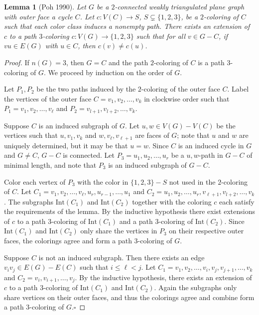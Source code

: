 \documentclass[12pt,letterpaper]{article}
\theoremstyle{plain}
\newtheorem{lemma}{Lemma}[section]           %
\theoremstyle{definition}
\theoremstyle{break}
\newcommand{\ggcqedsymbol}{$\square$}
\newcommand{\ggcqed}{\hbox{}\nobreak\hbox{\quad\ggcqedsymbol}}
\newcommand{\ggcnopf}{\ggcqed}
\begin{document}
\begin{lemma}[Poh 1990]\label{L:planar3c}
Let $G$ be a $2$-connected weakly triangulated plane graph with outer face a
cycle $C$. Let $c:V(C)\to S$, $S\subsetneq\{1,2,3\}$, be a $2$-coloring of $C$ such
that each color class induces a nonempty path. There exists an extension of
$c$ to a path $3$-coloring $c:V(G)\to\{1,2,3\}$ such that for all $v\in G-C$, if $vu\in
E(G)$ with $u\in C$, then $c(v)\ne c(u)$.
\end{lemma}

\begin{proof}
If $n(G)=3$, then $G=C$ and the path $2$-coloring of $C$ is a path
$3$-coloring of $G$. We proceed by induction on the order of $G$. 

Let $P_1,P_2$ be the two paths induced by the $2$-coloring of the outer face
$C$. 
Label the vertices of the outer face $C=v_1,v_2,\ldots, v_k$ in clockwise
order such that $P_1=v_1,v_2,\ldots, v_\ell$ and
$P_2=v_{l+1},v_{l+2},\ldots, v_k$.

Suppose $C$ is an induced subgraph of $G$. Let
$u,w\in V(G)-V(C)$ be the vertices such that $u,v_1,v_k$ and $w,v_\ell,v_{\ell+1}$
are faces of $G$; note that
$u$ and $w$ are uniquely determined, but it may be that $u=w$. Since
$C$ is an induced cycle in $G$ and $G\ne C$, $G-C$ is connected.
Let $P_3=u_1,u_2,\ldots,u_r$ be a $u,w$-path in $G-C$ of minimal length, and
note that $P_3$ is an induced subgraph of $G-C$.

Color each vertex of $P_3$ with the color in $\{1,2,3\}- S$ not used
in the $2$-coloring of
$C$. Let $C_1=v_1,v_2,\ldots,v_\ell,u_r,u_{r-1},\ldots,u_1$ and
$C_2=u_1,u_2,\ldots,u_r,v_{\ell+1},v_{l+2},\ldots,v_k$. The subgraphs
$\text{Int}(C_1)$ and $\text{Int}(C_2)$ together with the coloring $c$
each satisfy the requirements of the lemma. By the inductive hypothesis
there exist extensions of $c$ to a path
$3$-coloring of $\text{Int}(C_1)$ and a path $3$-coloring of $\text{Int}(C_2)$.
Since $\text{Int}(C_1)$ and $\text{Int}(C_2)$ only share the vertices in $P_3$
on their respective outer faces, the colorings agree and form a path
$3$-coloring of $G$.

Suppose $C$ is not an induced subgraph. Then there
exists an edge $v_iv_j\in E(G)-E(C)$ such that $i\le \ell < j$. Let
$C_1=v_1,v_2,\ldots,v_i,v_j,v_{j+1},\ldots,v_k$
and $C_2=v_i,v_{i+1},\ldots,v_j$.
By the inductive hypothesis, there exists an extension of $c$ to a path
$3$-coloring of $\text{Int}(C_1)$ and $\text{Int}(C_2)$. Again
the subgraphs only share vertices on their outer faces, and thus the
colorings agree and combine form a path $3$-coloring of $G$.\ggcnopf
\end{proof}
\end{document}
